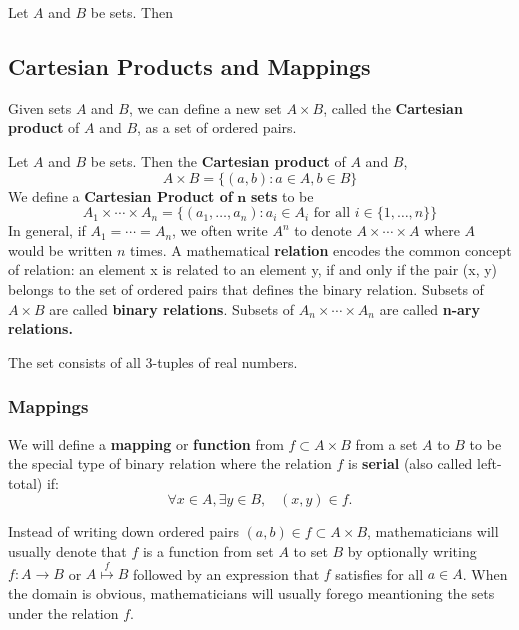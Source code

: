 \documentclass[11pt]{article} %
\newcommand\R[1]{\text{$\mathbb{R}^{#1}$}}
\newcommand\set[1]{\{#1\}}
\newcommand\ls[2]{#1_1, \ldots, #1_{#2}}
\begin{document}
{Let $A$ and $B$ be sets. Then
}{}


\subsection{Cartesian Products and Mappings}
Given sets $A$ and $B$, we can define a new set $A \times B$, called the \textbf{Cartesian product} of $A$ and $B$, as a set of ordered pairs. 

{
Let $A$ and $B$ be sets. Then the \textbf{Cartesian product} of $A$ and $B$,
$$
A \times B = \set{(a, b) : a \in A, b \in B}
$$
We define a \textbf{Cartesian Product of }$\mathbf{n}$ \textbf{sets} to be
$$
A_1 \times \cdots \times A_n = \set{(\ls{a}{n}) : a_i \in A_i \text{ for all } i \in \set{1, \ldots, n}} 
$$
}
In general, if $A_1 = \cdots = A_n$, we often write $A^n$ to denote $A \times \cdots \times A$ where $A$ would be written $n$ times.  A mathematical \textbf{relation} encodes the common concept of relation: an element x is related to an element y, if and only if the pair (x, y) belongs to the set of ordered pairs that defines the binary relation.  Subsets of $A \times B$ are called \textbf{binary relations}. Subsets of $A_n \times \cdots \times A_n$ are called \textbf{n-ary relations.}

\example{\R{3}}
{The set \R{3} consists of all 3-tuples of real numbers.}


\subsubsection{Mappings}
{We will define a \textbf{mapping} or \textbf{function} from $f \subset A \times B$ from a set $A$ to $B$ to be the special type of binary relation where the relation $f$ is
{
\textbf{serial} (also called left-total) if:
$$\forall x \in A, \exists y \in B, \hspace{10pt} (x,y) \in f.$$
}
}

Instead of writing down ordered pairs $(a, b) \in f \subset A \times B$, mathematicians will usually denote that $f$ is a function from set $A$ to set $B$ by optionally writing $f: A \to B$ or $A\overset{f}{\mapsto}B$ followed by an expression that $f$ satisfies for all $a \in A$. When the domain is obvious, mathematicians will usually forego meantioning the sets under the relation $f$.
\end{document}
